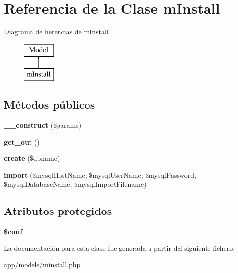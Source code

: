 \hypertarget{classm_install}{}\section{Referencia de la Clase m\+Install}
\label{classm_install}
Diagrama de herencias de m\+Install\begin{figure}[H]
\begin{center}
\leavevmode
\includegraphics[height=2.000000cm]{classm_install}
\end{center}
\end{figure}
\subsection*{Métodos públicos}
\begin{DoxyCompactItemize}
\item 
\hypertarget{classm_install_a9162320adff1a1a4afd7f2372f753a3e}{}{\bfseries \+\_\+\+\_\+construct} (\$params)\label{classm_install_a9162320adff1a1a4afd7f2372f753a3e}

\item 
\hypertarget{classm_install_aa67567dc404200190a6abcae9262dba0}{}{\bfseries get\+\_\+out} ()\label{classm_install_aa67567dc404200190a6abcae9262dba0}

\item 
\hypertarget{classm_install_a730338378f77a6e490a10938166a6cc1}{}{\bfseries create} (\$dbname)\label{classm_install_a730338378f77a6e490a10938166a6cc1}

\item 
\hypertarget{classm_install_aa5e085eb04d3e6db625536f7e02a5d55}{}{\bfseries import} (\$mysql\+Host\+Name, \$mysql\+User\+Name, \$mysql\+Password, \$mysql\+Database\+Name, \$mysql\+Import\+Filename)\label{classm_install_aa5e085eb04d3e6db625536f7e02a5d55}

\end{DoxyCompactItemize}
\subsection*{Atributos protegidos}
\begin{DoxyCompactItemize}
\item 
\hypertarget{classm_install_ae4901046cc3e1deebf77ccc785384a78}{}{\bfseries \$conf}\label{classm_install_ae4901046cc3e1deebf77ccc785384a78}

\end{DoxyCompactItemize}


La documentación para esta clase fue generada a partir del siguiente fichero\+:\begin{DoxyCompactItemize}
\item 
app/models/minstall.\+php\end{DoxyCompactItemize}
